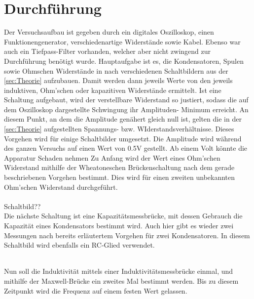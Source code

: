 \section{Durchführung}
\label{sec:Durchführung}
Der Versuchsaufbau ist gegeben durch ein digitales Oszilloskop, einen Funktionengenerator, verschiedenartige 
Widerstände sowie Kabel. Ebenso war auch ein Tiefpass-Filter vorhanden, welcher aber nicht zwingend zur
Durchführung benötigt wurde. Hauptaufgabe ist es, die Kondensatoren, Spulen sowie Ohmschen Widerstände in 
nach verschiedenen Schaltbildern aus der \ref{sec:Theorie} aufzubauen. Damit werden dann jeweils Werte von den 
jeweils induktiven, Ohm'schen oder kapazitiven Widerstände ermittelt. Ist eine Schaltung aufgebaut, wird 
der verstellbare Widerstand so justiert, sodass die auf dem Oszilloskop dargestellte Schwingung ihr Amplituden-
Minimum erreicht. An diesem Punkt, an dem die Amplitude genähert gleich null ist, gelten 
die in der \ref{sec:Theorie} aufgestellten Spannungs- bzw. WIderstandsverhältnisse. Dieses Vorgehen wird
für einige Schaltbilder umgesetzt. Die Amplitude wird während des ganzen Versuchs auf einen Wert von 0.5V gestellt.
Ab einem Volt könnte die Apparatur Schaden nehmen Zu Anfang wird der Wert eines Ohm'schen Widerstand mithilfe der 
Wheatoneschen Brückenschaltung nach dem  gerade beschriebenen Vorgehen bestimmt. Dies wird für einen
zweiten unbekannten Ohm'schen Widerstand durchgeführt.\\
\\
Schaltbild??
\\
Die nächste Schaltung ist eine Kapazitätsmessbrücke, mit dessen Gebrauch die Kapazität eines Kondensators
bestimmt wird. Auch hier gibt es wieder zwei Messungen nach bereits erläutertem Vorgehen für zwei Kondensatoren.
In diesem Schaltbild wird ebenfalls ein RC-Glied verwendet.

\\
Nun soll die Induktivität mittels einer Induktivitätsmessbrücke einmal, und mithilfe der Maxwell-Brücke ein zweites Mal 
bestimmt werden. Bis zu diesem Zeitpunkt wird die Frequenz auf einem festen Wert gelassen. 

